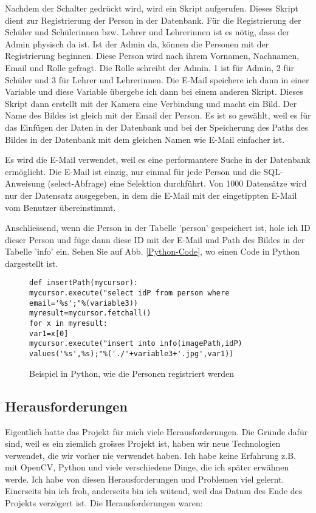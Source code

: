 \begin{enumerate}
Nachdem der Schalter gedr\"uckt wird, wird ein Skript aufgerufen. Dieses Skript dient zur Registrierung der Person in der Datenbank.
F\"ur die Registrierung der Sch\"uler und Sch\"ulerinnen bzw. Lehrer und Lehrerinnen ist es n\"otig, dass der Admin physisch da ist. Ist der Admin da, k\"onnen die Personen mit der Registrierung beginnen.
Diese Person wird nach ihrem Vornamen, Nachnamen, Email und Rolle gefragt. Die Rolle schreibt der Admin. 1 ist f\"ur Admin, 2 f\"ur Sch\"uler und 3 f\"ur Lehrer und Lehrerinnen. Die E-Mail speichere ich dann in einer Variable und diese Variable \"ubergebe ich dann bei einem anderen Skript. Dieses Skript dann erstellt mit der Kamera eine Verbindung und macht ein Bild. Der Name des Bildes ist gleich mit der Email der Person. Es ist so gew\"ahlt, weil es f\"ur das Einf\"ugen der Daten in der Datenbank und bei der Speicherung des Paths des Bildes in der Datenbank mit dem gleichen Namen wie E-Mail einfacher ist.

Es wird die E-Mail verwendet, weil es eine performantere Suche in der Datenbank erm\"oglicht. Die E-Mail ist einzig, nur einmal f\"ur jede Person und die SQL-Anweisung (select-Abfrage) eine Selektion durchf\"uhrt. Von 1000 Datens\"atze wird nur der Datensatz ausgegeben, in dem die E-Mail mit der eingetippten E-Mail vom Benutzer \"ubereinstimmt.


Anschlie\"ssend, wenn die Person in der Tabelle 'person' gespeichert ist, hole ich ID dieser Person und f\"uge dann diese ID mit der E-Mail und Path des Bildes in der Tabelle 'info' ein. Sehen Sie auf Abb. \ref{Python-Code}, wo einen Code in Python dargestellt ist. 
\end{enumerate}
\begin{figure}
\caption{Beispiel in Python, wie die Personen registriert werden}
\label{fig:Python-Code}
\begin{lstlisting}
def insertPath(mycursor):
mycursor.execute("select idP from person where email='%s';"%(variable3))
myresult=mycursor.fetchall()
for x in myresult:
var1=x[0]
mycursor.execute("insert into info(imagePath,idP) values('%s',%s);"%('./'+variable3+'.jpg',var1))

\end{lstlisting}

\end{figure}
\subsection{Herausforderungen}
Eigentlich hatte das Projekt f\"ur mich viele Herausforderungen. Die Gr\"unde daf\"ur sind, weil es ein ziemlich gro\"sses Projekt ist, haben wir neue Technologien verwendet, die wir vorher nie verwendet haben. Ich habe keine Erfahrung z.B. mit OpenCV, Python und viele verschiedene Dinge, die ich sp\"ater erw\"ahnen werde. Ich habe von diesen Herausforderungen und Problemen viel gelernt. Einerseits bin ich froh, anderseits bin ich w\"utend, weil das Datum des Ende des Projekts verz\"ogert ist. 
Die Herausforderungen waren:

